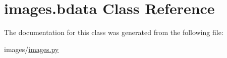 \hypertarget{classimages_1_1bdata}{}\section{images.\+bdata Class Reference}
\label{classimages_1_1bdata}


The documentation for this class was generated from the following file\+:\begin{DoxyCompactItemize}
\item 
images/\hyperlink{images_8py}{images.\+py}\end{DoxyCompactItemize}
